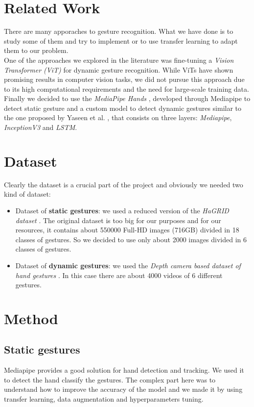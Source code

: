 \documentclass[10pt,twocolumn,letterpaper]{article}
\begin{document}
\section{Related Work}
There are many apporaches to gesture recognition. What we have done is to study some of them and try to implement or to use transfer learning to adapt them to our problem. \\
One of the approaches we explored in the literature was fine-tuning a \textit{Vision Transformer (ViT)} for dynamic gesture recognition. While ViTs have shown promising results in computer vision tasks, we did not pursue this approach due to its high computational requirements and the need for large-scale training data. \\
Finally we decided to use the \textit{MediaPipe Hands} \cite{zhang2020mediapipehandsondevicerealtime}, developed through Mediapipe \cite{lugaresi2019mediapipeframeworkbuildingperception} 
to detect static gesture and a custom model to detect dynamic gestures similar to the one proposed by Yaseen et al. \cite{electronics13163233}, that consists on three layers: \textit{Mediapipe}, \textit{InceptionV3} and \textit{LSTM}.

\section{Dataset}
Clearly the dataset is a crucial part of the project and obviously we needed two kind of dataset:
\begin{itemize}
   \item Dataset of \textbf{static gestures}: we used a reduced version of the \textit{HaGRID dataset} \cite{Alexander_2024}. The original dataset is too big for our purposes and for our resources, it contains about 550000 Full-HD images (716GB) divided in 18 classes of gestures. So we decided to use only about 2000 images divided in 6 classes of gestures.
   \item Dataset of \textbf{dynamic gestures}: we used the \textit{Depth camera based dataset of hand gestures} \cite{JEERU2022108659}. In this case there are about 4000 videos of 
   6 different gestures.
\end{itemize}

\section{Method}
\subsection{Static gestures}
Mediapipe provides a good solution for hand detection and tracking. We used it to detect the hand classify the gestures.
The complex part here was to understand how to improve the accuracy of the model and we made it by using transfer learning, data augmentation and hyperparameters tuning.
\end{document}
